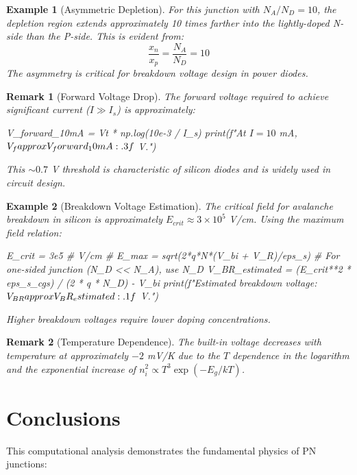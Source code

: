 \documentclass[a4paper, 11pt]{article}
\newtheorem{example}{Example}[section]
\newtheorem{remark}{Remark}[section]
\begin{document}
\begin{example}[Asymmetric Depletion]
For this junction with $N_A/N_D = 10$, the depletion region extends approximately
10 times farther into the lightly-doped N-side than the P-side. This is evident from:
\[
\frac{x_n}{x_p} = \frac{N_A}{N_D} = 10
\]
The asymmetry is critical for breakdown voltage design in power diodes.
\end{example}

\begin{remark}[Forward Voltage Drop]
The forward voltage required to achieve significant current ($I \gg I_s$) is approximately:
\begin{pycode}
V_forward_10mA = Vt * np.log(10e-3 / I_s)
print(f"At $I = 10$ mA, $V_f \\approx {V_forward_10mA:.3f}$ V.")
\end{pycode}
This $\sim 0.7$ V threshold is characteristic of silicon diodes and is widely used in
circuit design.
\end{remark}

\begin{example}[Breakdown Voltage Estimation]
The critical field for avalanche breakdown in silicon is approximately $E_{crit} \approx 3 \times 10^5$ V/cm.
Using the maximum field relation:
\begin{pycode}
E_crit = 3e5  # V/cm
# E_max = sqrt(2*q*N*(V_bi + V_R)/eps_s)
# For one-sided junction (N_D << N_A), use N_D
V_BR_estimated = (E_crit**2 * eps_s_cgs) / (2 * q * N_D) - V_bi
print(f"Estimated breakdown voltage: $V_{{BR}} \\approx {V_BR_estimated:.1f}$ V.")
\end{pycode}
Higher breakdown voltages require lower doping concentrations.
\end{example}

\begin{remark}[Temperature Dependence]
The built-in voltage decreases with temperature at approximately $-2$ mV/K due to
the $T$ dependence in the logarithm and the exponential increase of $n_i^2 \propto T^3 \exp(-E_g/kT)$.
\end{remark}

\section{Conclusions}

This computational analysis demonstrates the fundamental physics of PN junctions:
\end{document}
